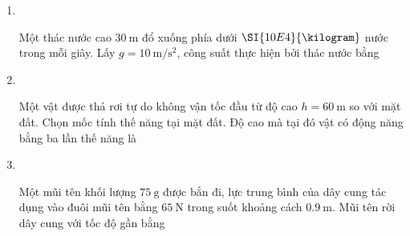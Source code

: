 \begin{enumerate}[label=\bfseries Câu \arabic*:, leftmargin=1.5cm]
\item {}\\
{Một thác nước cao $\SI{30}{\meter}$ đổ xuống phía dưới $\SI{10E4}{\kilogram}$ nước trong mỗi giây. Lấy $g =\SI{10}{\meter/\second^2}$, công suất thực hiện bởi thác nước bằng
}


\item {}\\
{Một vật được thả rơi tự do không vận tốc đầu từ độ cao $h=\SI{60}{\meter}$ so với mặt đất. Chọn mốc tính thế năng tại mặt đất. Độ cao mà tại đó vật có động năng bằng ba lần thế năng là
}

\item {}\\
{Một mũi tên khối lượng $\SI{75}{\gram}$ được bắn đi, lực trung bình của dây cung tác dụng vào đuôi mũi tên bằng $\SI{65}{\newton}$ trong suốt khoảng cách $\SI{0.9}{\meter}$. Mũi tên rời dây cung với tốc độ gần bằng
	\begin{mcq}(4)
		\item $\SI{59}{\meter/\second}$.
		\item $\SI{40}{\meter/\second}$.
		\item $\SI{72}{\meter/\second}$.
		\item $\SI{68}{\meter/\second}$.
	\end{mcq}
}


\end{enumerate}
